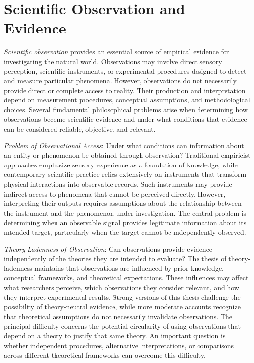 %
%

\section{Scientific Observation and Evidence}
\label{sec:scientific_observation}

\emph{Scientific observation} provides an essential source of empirical evidence for investigating the natural world. Observations may involve direct sensory perception, scientific instruments, or experimental procedures designed to detect and measure particular phenomena. However, observations do not necessarily provide direct or complete access to reality. Their production and interpretation depend on measurement procedures, conceptual assumptions, and methodological choices. Several fundamental philosophical problems arise when determining how observations become scientific evidence and under what conditions that evidence can be considered reliable, objective, and relevant.

\emph{Problem of Observational Access}: Under what conditions can information about an entity or phenomenon be obtained through observation? Traditional empiricist approaches emphasize sensory experience as a foundation of knowledge, while contemporary scientific practice relies extensively on instruments that transform physical interactions into observable records. Such instruments may provide indirect access to phenomena that cannot be perceived directly. However, interpreting their outputs requires assumptions about the relationship between the instrument and the phenomenon under investigation. The central problem is determining when an observable signal provides legitimate information about its intended target, particularly when the target cannot be independently observed.

\emph{Theory-Ladenness of Observation}: Can observations provide evidence independently of the theories they are intended to evaluate? The thesis of theory-ladenness maintains that observations are influenced by prior knowledge, conceptual frameworks, and theoretical expectations. These influences may affect what researchers perceive, which observations they consider relevant, and how they interpret experimental results. Strong versions of this thesis challenge the possibility of theory-neutral evidence, while more moderate accounts recognize that theoretical assumptions do not necessarily invalidate observations. The principal difficulty concerns the potential circularity of using observations that depend on a theory to justify that same theory. An important question is whether independent procedures, alternative interpretations, or comparisons across different theoretical frameworks can overcome this difficulty.


